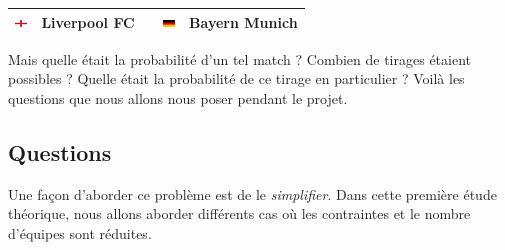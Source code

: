 \documentclass{../ficheTDTP}
\begin{document}
\begin{tabular}{|clccl|}
\includegraphics[height=0.2cm]{flags/en.png} & Liverpool FC & & \includegraphics[height=0.2cm]{flags/de.png} & Bayern Munich \\ \hline
\end{tabular}

\vspace{0.5cm}

Mais quelle était la probabilité d'un tel match ? Combien de tirages étaient possibles ? Quelle était la probabilité de ce tirage en particulier ? Voilà les questions que nous allons nous poser pendant le projet.

\subsection{Questions}

Une façon d'aborder ce problème est de le \textit{simplifier}. Dans cette première étude théorique, nous allons aborder différents cas où les contraintes et le nombre d'équipes sont réduites.
\end{document}
